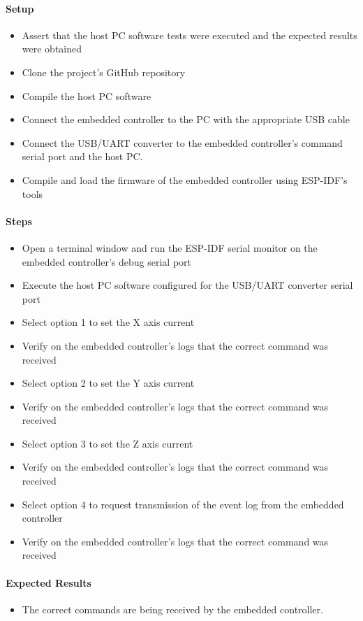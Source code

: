 \documentclass[10pt,twocolumn,letterpaper]{article}
\begin{document}
\paragraph{Setup}
\begin{itemize}
  \item Assert that the host PC software tests were executed and the expected results were obtained
  \item Clone the project's GitHub repository \cite{mygit}
  \item Compile the host PC software
  \item Connect the embedded controller to the PC with the appropriate USB cable
  \item Connect the USB/UART converter to the embedded controller's command serial port and the host PC.
  \item Compile and load the firmware of the embedded controller using ESP-IDF's tools
\end{itemize}

\paragraph{Steps}
\begin{itemize}
  \item Open a terminal window and run the ESP-IDF serial monitor on the embedded controller's debug serial port
  \item Execute the host PC software configured for the USB/UART converter serial port
  \item Select option 1 to set the X axis current
  \item Verify on the embedded controller's logs that the correct command was received
  \item Select option 2 to set the Y axis current
  \item Verify on the embedded controller's logs that the correct command was received
  \item Select option 3 to set the Z axis current
  \item Verify on the embedded controller's logs that the correct command was received
  \item Select option 4 to request transmission of the event log from the embedded controller
  \item Verify on the embedded controller's logs that the correct command was received
\end{itemize}

\paragraph{Expected Results}

\begin{itemize}
  \item The correct commands are being received by the embedded controller.
\end{itemize}
\end{document}
